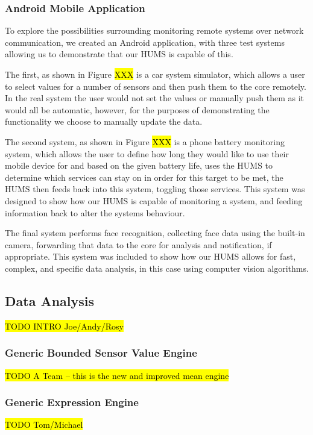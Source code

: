 \documentclass[10pt,a4paper]{article}
\begin{document}
\subsubsection{Android Mobile Application}
To explore the possibilities surrounding monitoring remote systems over network communication, we created an Android application, with three test systems allowing us to demonstrate that our HUMS is capable of this.

The first, as shown in Figure \hl{XXX} is a car system simulator, which allows a user to select values for a number of sensors and then push them to the core remotely. In the real system the user would not set the values or manually push them as it would all be automatic, however, for the purposes of demonstrating the functionality we choose to manually update the data.

The second system, as shown in Figure \hl{XXX} is a phone battery monitoring system, which allows the user to define how long they would like to use their mobile device for and based on the given battery life, uses the HUMS to determine which services can stay on in order for this target to be met, the HUMS then feeds back into this system, toggling those services. This system was designed to show how our HUMS is capable of monitoring a system, and feeding information back to alter the systems behaviour.

The final system performs face recognition, collecting face data using the built-in camera, forwarding that data to the core for analysis and notification, if appropriate. This system was included to show how our HUMS allows for fast, complex, and specific data analysis, in this case using computer vision algorithms.

\subsection{Data Analysis}
\label{sec:analysis}
\hl{TODO INTRO Joe/Andy/Rosy}

\subsubsection{Generic Bounded Sensor Value Engine}
\hl{TODO A Team -- this is the new and improved mean engine}

\subsubsection{Generic Expression Engine}
\hl{TODO Tom/Michael}
\end{document}
